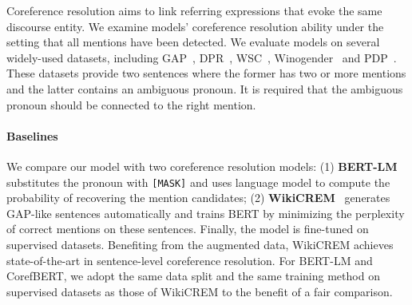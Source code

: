 \documentclass[11pt,a4paper]{article}
\newcommand\CorefBERT{CorefBERT\xspace}
\begin{document}
Coreference resolution aims to link referring expressions that evoke the same discourse entity. We examine models'  coreference resolution ability under the setting that all mentions have been detected. We evaluate models on several widely-used datasets, including GAP~\citep{GAP},  DPR~\citep{DPR}, WSC~\citep{WSC},  Winogender~\citep{Winogender} and PDP~\citep{PDP}.  
These datasets provide two sentences where the former has two or more mentions and the latter contains an ambiguous pronoun. It is required that the ambiguous pronoun should be connected to the right mention.

\vspace{-0.1em}
\paragraph{Baselines}
We  compare our model with two coreference resolution models: (1) \textbf{BERT-LM}~\citep{ASimpleMethodforCommonsenseReasoning} substitutes the pronoun with \texttt{[MASK]} and uses language model to compute the probability of recovering the mention candidates; (2) \textbf{WikiCREM}~\citep{wikicrem} generates GAP-like sentences automatically and trains BERT by minimizing the perplexity of correct mentions on these sentences. Finally, the model is fine-tuned on supervised datasets. Benefiting from the augmented data, WikiCREM achieves state-of-the-art in sentence-level coreference resolution. For BERT-LM and \CorefBERT, we adopt the same data split and the same training method on supervised datasets as those of WikiCREM to the benefit of a fair comparison.
\end{document}
